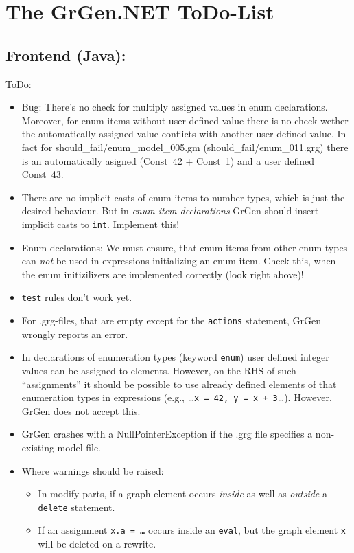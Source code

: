 \documentclass[12pt,a4paper]{article}
\begin{document}
\section*{\LARGE The GrGen.NET ToDo-List}



\subsection*{Frontend (Java):}
ToDo:
\begin{itemize}
	\item Bug: There's no check for multiply assigned values in enum declarations.
		Moreover, for enum items without user defined value there is no check wether the automatically assigned value conflicts with another user defined value.
		In fact for should\_fail/enum\_model\_005.gm (should\_fail/enum\_011.grg) there is an automatically asigned (Const~42 + Const~1) and a user defined Const~43.
	\item There are no implicit casts of enum items to number types, which is just the desired behaviour. But in \emph{enum item declarations} GrGen should insert implicit casts to {\tt int}. Implement this!
	\item Enum declarations: We must ensure, that enum items from other enum types can \emph{not} be used in expressions initializing an enum item.
		Check this, when the enum initizilizers are implemented correctly (look right above)!
    \item {\tt test} rules don't work yet.
	\item For .grg-files, that are empty except for the {\tt actions} statement, GrGen wrongly reports an error.
	\item In declarations of enumeration types (keyword {\tt enum}) user defined integer values can be assigned to elements.
	  However, on the RHS of such "`assignments"' it should be possible to use already defined elements of that enumeration types in expressions (e.g., \dots{}{\tt{}x = 42, y = x + 3}\dots). However, GrGen does not accept this.
    \item GrGen crashes with a NullPointerException if the .grg file specifies a non-existing model file.
	\item Where warnings should be raised:
		\begin{itemize}
			\item In modify parts, if a graph element occurs \emph{inside} as well as \emph{outside} a {\tt delete} statement.
			\item If an assignment {\tt x.a = \dots} occurs inside an {\tt eval}, but the graph element {\tt x} will be deleted on a rewrite.

\end{itemize}
\end{itemize}
\end{document}
